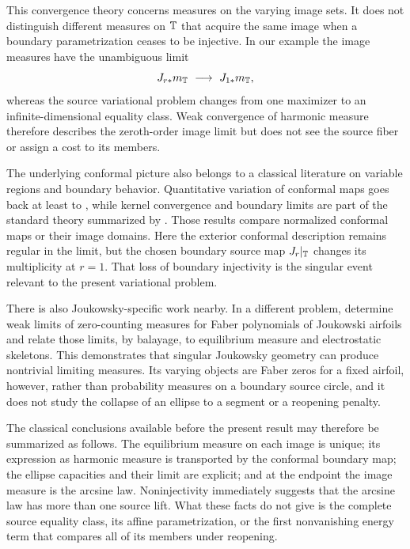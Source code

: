 This convergence theory concerns measures on the varying image sets.
It does not distinguish different measures on \(\mathbb{T}\) that acquire the
same image when a boundary parametrization ceases to be injective.  In
our example the image measures have the unambiguous limit
\[
 J_{r\ast}m_{\TT}\ \longrightarrow\ J_{1\ast}m_{\TT},
\]
whereas the source variational problem changes from one maximizer to
an infinite-dimensional equality class.  Weak convergence of harmonic
measure therefore describes the zeroth-order image limit but does not
see the source fiber or assign a cost to its members.

The underlying conformal picture also belongs to a classical
literature on variable regions and boundary behavior.  Quantitative
variation of conformal maps goes back at least to
\citet{Warschawski1950}, while kernel convergence and boundary limits
are part of the standard theory summarized by
\citet{Pommerenke1992}.  Those results compare normalized conformal
maps or their image domains.  Here the exterior conformal description
remains regular in the limit, but the chosen boundary source map
\(J_r|_{\mathbb{T}}\) changes its multiplicity at \(r=1\).  That loss of
boundary injectivity is the singular event relevant to the present
variational problem.

There is also Joukowsky-specific work nearby.  In a different problem,
\citet{LevenbergWielonsky2020} determine weak limits of zero-counting
measures for Faber polynomials of Joukowski airfoils and relate those
limits, by balayage, to equilibrium measure and electrostatic
skeletons.  This demonstrates that singular Joukowsky geometry can
produce nontrivial limiting measures.  Its varying objects are Faber
zeros for a fixed airfoil, however, rather than probability measures
on a boundary source circle, and it does not study the collapse of an
ellipse to a segment or a reopening penalty.

The classical conclusions available before the present result may
therefore be summarized as follows.  The equilibrium measure on each
image is unique; its expression as harmonic measure is transported by
the conformal boundary map; the ellipse capacities and their limit are
explicit; and at the endpoint the image measure is the arcsine law.
Noninjectivity immediately suggests that the arcsine law has more than
one source lift.  What these facts do not give is the complete source
equality class, its affine parametrization, or the first nonvanishing
energy term that compares all of its members under reopening.

